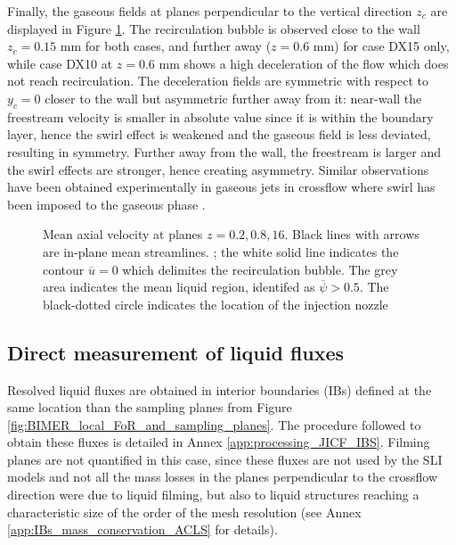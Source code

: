 Finally, the gaseous fields at planes perpendicular to the vertical direction $z_c$ are displayed in Figure \ref{fig:BIMER_turbulent_structures_planes_z}. The recirculation bubble is observed close to the wall $z_c = 0.15$ mm for both cases, and further away ($z = 0.6$ mm) for case DX15 only, while case DX10 at $z = 0.6$ mm shows a high deceleration of the flow which does not reach recirculation. The deceleration fields are symmetric with respect to $y_c = 0$ closer to the wall but asymmetric further away from it: near-wall the freestream velocity is smaller in absolute value since it is within the boundary layer, hence the swirl effect is weakened and the gaseous field is less deviated, resulting in symmetry. Further away from the wall, the freestream is larger and the swirl effects are stronger, hence creating asymmetry. Similar observations have been obtained experimentally in gaseous jets in crossflow where swirl has been imposed to the gaseous phase .


\begin{figure}[ht]
\centering
\caption[Mean axial velocity at planes $z = 0.2, 0.8, 16$ mm]{Mean axial velocity at planes $z = 0.2, 0.8, 16$. Black lines with arrows are in-plane mean streamlines. ; the white solid line indicates the contour $\overline{u} = 0$ which delimites the recirculation bubble. The grey area  indicates the mean liquid region, identifed as $\overline{\psi} > 0.5$. The black-dotted circle indicates the location of the injection nozzle}
\label{fig:BIMER_turbulent_structures_planes_z}
\end{figure}





\subsection{Direct measurement of liquid fluxes}
\label{subsec:ch8_BIMER_IBs}

Resolved liquid fluxes are obtained in  interior boundaries (IBs) defined at the same location than the sampling planes from Figure \ref{fig:BIMER_local_FoR_and_sampling_planes}. The procedure followed to obtain these fluxes is detailed in Annex \ref{app:processing_JICF_IBS}. Filming planes are not quantified in this case, since these fluxes are not used by the SLI models and not all the mass losses in the planes perpendicular to the crossflow direction were due to liquid filming, but also to liquid structures reaching a characteristic size of the order of the mesh resolution (see Annex \ref{app:IBs_mass_conservation_ACLS} for details).




